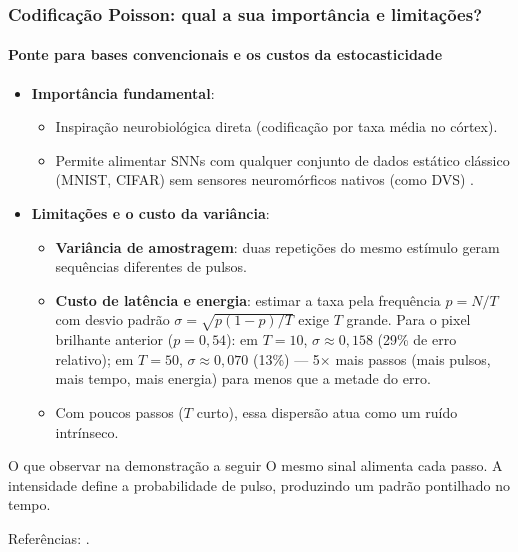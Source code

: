 \begin{frame}[shrink]
	\frametitle{Codificação Poisson: qual a sua importância e limitações?}
	\framesubtitle{Ponte para bases convencionais e os custos da estocasticidade}
	\footnotesize
	\begin{itemize}
		\setlength{\itemsep}{2pt}
		\item \textbf{Importância fundamental}:
		\begin{itemize}
			\item Inspiração neurobiológica direta (codificação por taxa média no córtex).
			\item Permite alimentar SNNs com qualquer conjunto de dados estático clássico (MNIST, CIFAR) sem sensores neuromórficos nativos (como DVS) \cite{diehl2015fast}.
		\end{itemize}
		\item \textbf{Limitações e o custo da variância}:
		\begin{itemize}
			\item \textbf{Variância de amostragem}: duas repetições do mesmo estímulo geram sequências diferentes de pulsos.
			\item \textbf{Custo de latência e energia}: estimar a taxa pela frequência $\hat{p} = N/T$ com desvio padrão $\sigma = \sqrt{p(1-p)/T}$ exige $T$ grande. Para o pixel brilhante anterior ($p=0{,}54$): em $T=10$, $\sigma \approx 0{,}158$ (29\% de erro relativo); em $T=50$, $\sigma \approx 0{,}070$ (13\%) --- 5$\times$ mais passos (mais pulsos, mais tempo, mais energia) para menos que a metade do erro.
			\item Com poucos passos ($T$ curto), essa dispersão atua como um ruído intrínseco.
		\end{itemize}
	\end{itemize}
	\begin{block}{O que observar na demonstração a seguir}
		O mesmo sinal alimenta cada passo. A intensidade define a probabilidade de pulso, produzindo um padrão pontilhado no tempo.
	\end{block}
	\par\vfill{\tiny Referências: \cite{diehl2015fast, eshraghian2023training}.}
\end{frame}
